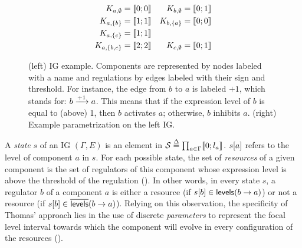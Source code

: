 \begin{figure}[t]
\begin{minipage}{0.4\linewidth}
\centering
{}
\end{minipage}
\begin{minipage}{0.6\linewidth}
\centering
\begin{align*}
  K_{a,\emptyset} &= \llbracket 0 ; 0 \rrbracket & K_{b,\emptyset} &= \llbracket 0 ; 1 \rrbracket \\
  K_{a,\{b\}} &= \llbracket 1 ; 1 \rrbracket & K_{b,\{a\}} &= \llbracket 0 ; 0 \rrbracket \\
  K_{a,\{c\}} &= \llbracket 1 ; 1 \rrbracket &&\\
  K_{a,\{b,c\}} &= \llbracket 2 ; 2 \rrbracket & K_{c,\emptyset} &= \llbracket 0 ; 1 \rrbracket
\end{align*}
\end{minipage}
\caption{\label{fig:runningBRN}
  (left)
  IG example.
  Components are represented by nodes labeled with a name
  and regulations by edges labeled with their sign and threshold.
  For instance, the edge from $b$ to $a$ is labeled $+1$, which stands for: $b \xrightarrow{+ 1} a$.
  This means that if the expression level of $b$ is equal to (\ie above) 1, then $b$ activates $a$;
  otherwise, $b$ inhibits $a$.
  (right)
  Example parametrization on the left IG.
}
\end{figure}

A \emph{state} $s$ of an IG $(\Gamma, E)$ is an element in $\mathcal{S} \stackrel{\Delta}= \prod_{a \in \Gamma} \llbracket 0 ; l_a \rrbracket$.
${s[a]}$ refers to the level of component $a$ in $s$.
For each possible state, the set of \emph{resources} of a given component
is the set of regulators of this component whose expression level is above the threshold of the regulation ().
In other words, in every state $s$, a regulator $b$ of a component $a$
is either a resource (if ${s[b]} \in \mathsf{levels}(b\rightarrow a)$)
or not a resource (if ${s[b]} \in \overline{\mathsf{levels}}(b\rightarrow a)$).
Relying on this observation, the specificity of Thomas' approach lies in the use of discrete \emph{parameters} to represent the
focal level interval towards which the component will evolve in every configuration of the resources ().

